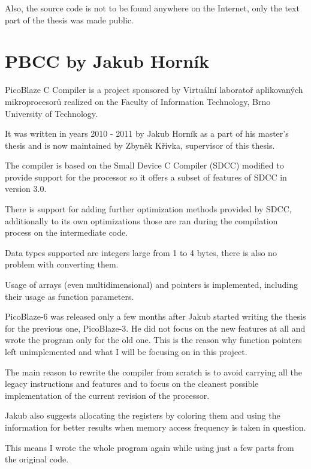     Also, the source code is not to be found anywhere on the Internet, only the text part of the thesis was made public.


    \section{PBCC by Jakub Horník}\label{prev_pbcc}


    PicoBlaze C Compiler is a project sponsored by Virtuální laboratoř aplikovaných mikroprocesorů 
    realized on the Faculty of Information Technology, Brno University of Technology.

    It was written in years 2010 - 2011 by Jakub Horník as a part of his master's thesis and is now maintained by Zbyněk Křivka, supervisor of this thesis.

    The compiler is based on the Small Device C Compiler (SDCC) modified to provide support for the processor so it offers a subset of features of SDCC in version 3.0.

    There is support for adding further optimization methods provided by SDCC, additionally to its own optimizations those are ran during the compilation process on the intermediate code.

    Data types supported are integers large from 1 to 4 bytes, there is also no problem with converting them.

    Usage of arrays (even multidimensional) and pointers is implemented, including their usage as function parameters.

    PicoBlaze-6 was released only a few months after Jakub started writing the thesis for the previous one, PicoBlaze-3. 
    He did not focus on the new features at all and wrote the program only for the old one.
    This is the reason why function pointers left unimplemented and what I will be focusing on in this project.

    The main reason to rewrite the compiler from scratch is to avoid carrying all the legacy instructions and features and to focus on the cleanest possible implementation of the current revision of the processor.

    Jakub also suggests allocating the registers by coloring them and using the information for better results when memory access frequency is taken in question.

    This means I wrote the whole program again while using just a few parts from the original code.


